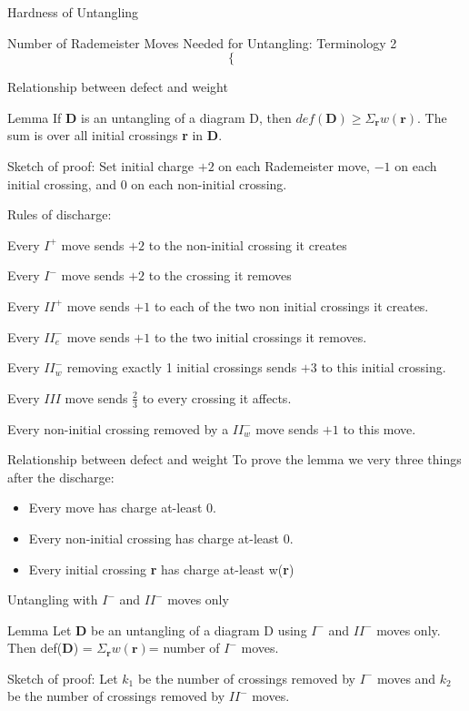 \documentclass{beamer}
\begin{document}
\begin{section}{Hardness of Untangling}
\begin{frame}{Number of Rademeister Moves Needed for Untangling: Terminology 2}
\[\begin{cases}{}
            \end{cases}
        \]
    \end{frame} 
    
    \begin{frame}{Relationship between defect and weight}
        \begin{block}{Lemma}
            If \textbf{D} is an untangling of a diagram D, then $def(\textbf{D}) \geq \Sigma_{\mathbf{r}} w(\mathbf{r})$. The sum is over all initial crossings \textbf{r} in \textbf{D}. 
        \end{block}{}
    Sketch of proof: Set initial charge $+2$ on each Rademeister move, $-1$ on each initial crossing, and $0$ on each non-initial crossing. 
    
    Rules of discharge:
   
         Every $I^+$ move sends $+2$ to the non-initial crossing it creates
         
         Every $I^-$ move sends $+2$ to the crossing it removes
         
         Every $II^+$ move sends $+1$ to each of the two non initial crossings it creates.
         
         Every $II^-_e$ move sends $+1$ to the two initial crossings it removes.
         
         Every $II^-_w$ removing exactly 1 initial crossings sends $+3$ to this initial crossing.
         
         Every $III$ move sends $\frac{2}{3}$ to every crossing it affects.
         
         Every non-initial crossing removed by a $II^-_w$ move sends $+1$ to this move. 
   \end{frame}
   
    \begin{frame}{Relationship between defect and weight}
       To prove the lemma we very three things after the discharge:
       \begin{itemize}
           \item Every move has charge at-least 0.
           \item Every non-initial crossing has charge at-least 0.
           \item Every initial crossing \textbf{r} has charge at-least w(\textbf{r})
       \end{itemize}{}
   \end{frame}{}

    \begin{frame}{Untangling with $I^-$ and $II^-$ moves only}
        \begin{block}{Lemma}
            Let \textbf{D} be an untangling of a diagram D using $I^-$ and $II^-$ moves only. Then  def(\textbf{D}) = $\Sigma_\mathbf{r} w(\mathbf{r})$= number of $I^-$ moves. 
        \end{block}{}
    Sketch of proof: Let $k_1$ be the number of crossings removed by $I^-$ moves and $k_2$ be the number of crossings removed by $II^-$ moves. 
    

\end{frame}
\end{section}
\end{document}
